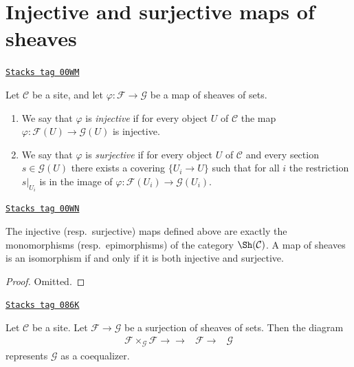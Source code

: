 \section{Injective and surjective maps of sheaves}
\label{sites-section-sheaves-injective}
\begin{definition}
\label{sites-definition-sheaves-injective-surjective}
\href{https://stacks.math.columbia.edu/tag/00WM}{\texttt{Stacks tag 00WM}}

Let $\mathcal{C}$ be a site, and let $\varphi : \mathcal{F}
\to \mathcal{G}$ be a map of sheaves of sets.
\begin{enumerate}
\item We say that $\varphi$ is {\it injective} if for every object
$U$ of $\mathcal{C}$ the map $\varphi : \mathcal{F}(U)
\to \mathcal{G}(U)$ is injective.
\item We say that $\varphi$ is {\it surjective} if for every object
$U$ of $\mathcal{C}$ and every section $s\in \mathcal{G}(U)$
there exists a covering $\{U_i \to U\}$ such that for
all $i$ the restriction $s|_{U_i}$ is in the image of
$\varphi : \mathcal{F}(U_i) \to \mathcal{G}(U_i)$.
\end{enumerate}
\end{definition}

\begin{lemma}
\label{sites-lemma-mono-epi-sheaves}
\href{https://stacks.math.columbia.edu/tag/00WN}{\texttt{Stacks tag 00WN}}

The injective (resp.\ surjective) maps defined above
are exactly the monomorphisms (resp.\ epimorphisms) of
the category $\Sh(\mathcal{C})$. A map of sheaves
is an isomorphism if and only if it is both injective
and surjective.
\end{lemma}

\begin{proof}
Omitted.
\end{proof}

\begin{lemma}
\label{sites-lemma-coequalizer-surjection}
\href{https://stacks.math.columbia.edu/tag/086K}{\texttt{Stacks tag 086K}}

Let $\mathcal{C}$ be a site. Let $\mathcal{F} \to \mathcal{G}$
be a surjection of sheaves of sets. Then the diagram
$$
\begin{array}{ccc}\mathcal{F} \times_\mathcal{G} \mathcal{F}
\longrightarrow\longrightarrow & \mathcal{F} \longrightarrow & \mathcal{G}\end{array}
$$
represents $\mathcal{G}$ as a coequalizer.
\end{lemma}

